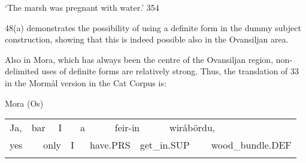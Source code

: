 \begin{styleTranslation}
‘The marsh was pregnant with water.’ 354

\end{styleTranslation}

\begin{styleBodyTextFirst}
48(a) demonstrates the possibility of using a definite form in the dummy subject construction, showing that this is indeed possible also in the Ovansiljan area. 

\end{styleBodyTextFirst}

\begin{styleBodytextC}
Also in Mora, which has always been the centre of the Ovansiljan region, non-delimited uses of definite forms are relatively strong. Thus, the translation of 33 in the Mormål version in the Cat Corpus is:

\end{styleBodytextC}


\begin{listWWNumileveli}
\item {}

\begin{styleExample}
Mora (Os)

\end{styleExample}

\end{listWWNumileveli}

\begin{tabular}{llllllllllll}
\lsptoprule
Ja, & \multicolumn{2}{l}{bar

} & \multicolumn{2}{l}{I

} & \multicolumn{2}{l}{a

} & \multicolumn{2}{l}{feir-in

} & \multicolumn{2}{l}{wiråbördu,

} & \\
\multicolumn{2}{l}{yes

} & \multicolumn{2}{l}{only

} & \multicolumn{2}{l}{I

} & \multicolumn{2}{l}{have.PRS

} & \multicolumn{2}{l}{get\_in.SUP

} & \multicolumn{2}{l}{wood\_bundle.DEF

}\\
\lspbottomrule
\end{tabular}


